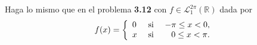 \documentclass[12pt]{report}
\theoremstyle{largebreak}
\begin{document}
    \begin{sol}
        
    \end{sol}

    \begin{excer}
        Haga lo mismo que en el problema \textbf{3.12} con $f\in\mathcal{L}_1^{2\pi}(\mathbb{R})$ dada por
        \begin{equation*}
            f(x)=\left\{ 
                \begin{array}{lcr}
                    0 & \textup{ si } & -\pi\leq x<0,\\
                    x & \textup{ si } & 0\leq x<\pi.\\
                \end{array}
            \right.
        \end{equation*}
    \end{excer}

    \begin{sol}
        
    \end{sol}
\end{document}
